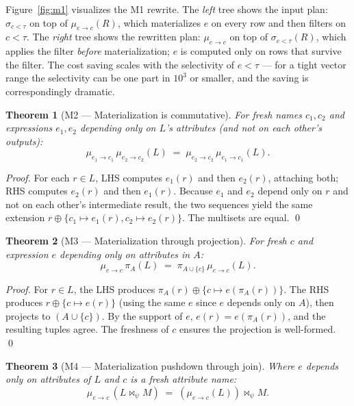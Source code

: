 \documentclass[sigconf,nonacm,review]{acmart}
\theoremstyle{plain}
\newtheorem{theorem}{Theorem}
\theoremstyle{definition}
\theoremstyle{remark}
\begin{document}
Figure~\ref{fig:m1} visualizes the M1 rewrite. The \emph{left} tree
shows the input plan: $\sigma_{c<\tau}$ on top of $\mu_{e\to c}(R)$,
which materializes $e$ on every row and then filters on $c < \tau$.
The \emph{right} tree shows the rewritten plan: $\mu_{e\to c}$ on
top of $\sigma_{e<\tau}(R)$, which applies the filter
\emph{before} materialization; $e$ is computed only on rows that
survive the filter. The cost saving scales with the selectivity
of $e < \tau$ --- for a tight vector range the selectivity can be
one part in $10^3$ or smaller, and the saving is correspondingly
dramatic.

\begin{theorem}[M2 --- Materialization is commutative]\label{thm:m2}
For fresh names $c_1, c_2$ and expressions $e_1, e_2$ depending
only on $L$'s attributes (and not on each other's outputs):
\[
\mu_{e_1 \to c_1}\, \mu_{e_2 \to c_2}(L)
\;=\;
\mu_{e_2 \to c_2}\, \mu_{e_1 \to c_1}(L).
\]
\end{theorem}

\begin{proof}
For each $r \in L$, LHS computes $e_1(r)$ and then $e_2(r)$, attaching
both; RHS computes $e_2(r)$ and then $e_1(r)$. Because $e_1$ and
$e_2$ depend only on $r$ and not on each other's intermediate
result, the two sequences yield the same extension $r \oplus \{c_1
\mapsto e_1(r), c_2 \mapsto e_2(r)\}$. The multisets are equal. \qed
\end{proof}

\begin{theorem}[M3 --- Materialization through projection]\label{thm:m3}
For fresh $c$ and expression $e$ depending only on attributes in $A$:
\[
\mu_{e \to c}\, \pi_A(L) \;=\; \pi_{A \cup \{c\}}\, \mu_{e \to c}(L).
\]
\end{theorem}

\begin{proof}
For $r \in L$, the LHS produces $\pi_A(r) \oplus \{c \mapsto
e(\pi_A(r))\}$. The RHS produces $r \oplus \{c \mapsto e(r)\}$ (using
the same $e$ since $e$ depends only on $A$), then projects to
$(A \cup \{c\})$. By the support of $e$, $e(r) = e(\pi_A(r))$, and
the resulting tuples agree. The freshness of $c$ ensures the
projection is well-formed. \qed
\end{proof}

\begin{theorem}[M4 --- Materialization pushdown through join]\label{thm:m4}
Where $e$ depends only on attributes of $L$ and $c$ is a fresh
attribute name:
\[
\mu_{e \to c}\, (L \bowtie_\psi M)
\;=\;
(\mu_{e \to c}(L)) \bowtie_\psi M.
\]
\end{theorem}
\end{document}
